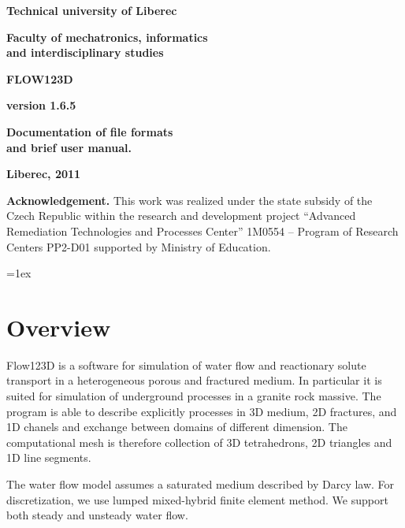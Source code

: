 \documentclass[12pt,a4paper]{report}
\begin{document}
\thispagestyle{empty}
\begin{center}
\noindent 
\textbf{\LARGE{
  Technical university of Liberec
}}

\vspace{2ex}
\textbf{\LARGE{
  Faculty of mechatronics, informatics\\
  and interdisciplinary studies
}}

\vspace{160pt}

\textbf{\Huge{
FLOW123D
}}

\vspace{1cm}
\textbf{\Large{
version 1.6.5
}}

\vspace{1cm}

\textbf{\Large{
Documentation of file formats \\
and brief user manual.
}}


\vspace{7cm}

\noindent \textbf{\Large{Liberec, 2011}}

\vspace{1cm}

{\bf Acknowledgement.} This work was realized under the state  subsidy of the Czech Republic within the research and development 
project ``Advanced Remediation Technologies and Processes Center'' 1M0554 
-- Program of Research Centers PP2-D01 supported by Ministry of Education.
\end{center}
\noindent 

\noindent

\setcounter{page}{2}

\parindent=0pt
\parskip=1ex

\section{Overview}
Flow123D is a software for simulation of water flow and reactionary solute transport in a heterogeneous 
porous and fractured medium. In particular it is suited for simulation of underground processes in a granite rock massive.
The program is able to describe explicitly processes in 3D medium, 2D fractures, and 1D chanels and exchange between 
domains of different dimension. The computational mesh is therefore collection of 3D tetrahedrons, 2D triangles and 1D line segments.

The water flow model assumes a saturated medium described by Darcy law. For discretization, we use lumped mixed-hybrid finite element method.
We support both steady and unsteady water flow.
\end{document}
